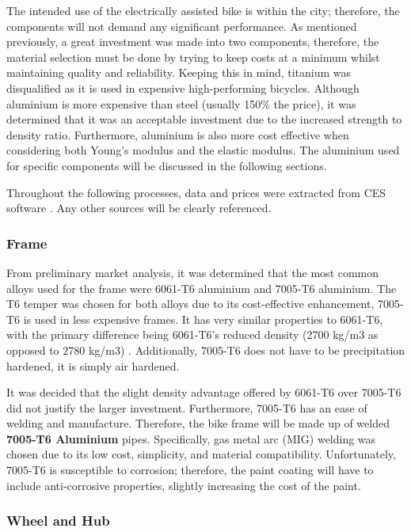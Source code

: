 \documentclass[a4paper,11pt]{article}
\begin{document}
The intended use of the electrically assisted bike is within the city; therefore, the components will not demand any significant performance. As mentioned previously, a great investment was made into two components, therefore, the material selection must be done by trying to keep costs at a minimum whilst maintaining quality and reliability. Keeping this in mind, titanium was disqualified as it is used in expensive high-performing bicycles. Although aluminium is more expensive than steel (usually 150\% the price), it was determined that it was an acceptable investment due to the increased strength to density ratio. Furthermore, aluminium is also more cost effective when considering both Young's modulus and the elastic modulus. The aluminium used for specific components will be discussed in the following sections. 

Throughout the following processes, data and prices were extracted from CES software \cite{CES}. Any other sources will be clearly referenced. 

\subsubsection{Frame}

From preliminary market analysis, it was determined that the most common alloys used for the frame were 6061-T6 aluminium and 7005-T6 aluminium. The T6 temper was chosen for both alloys due to its cost-effective enhancement, 7005-T6 is used in less expensive frames. It has very similar properties to 6061-T6, with the primary difference being 6061-T6's reduced density (2700 kg/m3 as opposed to 2780 kg/m3) \cite{mif}.  Additionally, 7005-T6 does not have to be precipitation hardened, it is simply air hardened. 

It was decided that the slight density advantage offered by 6061-T6 over 7005-T6 did not justify the larger investment. Furthermore, 7005-T6 has an ease of welding and manufacture. Therefore, the bike frame will be made up of welded \textbf{7005-T6 Aluminium} pipes. Specifically, gas metal arc (MIG) welding was chosen due to its low cost, simplicity, and material compatibility. Unfortunately, 7005-T6 is susceptible to corrosion; therefore, the paint coating will have to include anti-corrosive properties, slightly increasing the cost of the paint. 

\subsubsection{Wheel and Hub}
\end{document}
